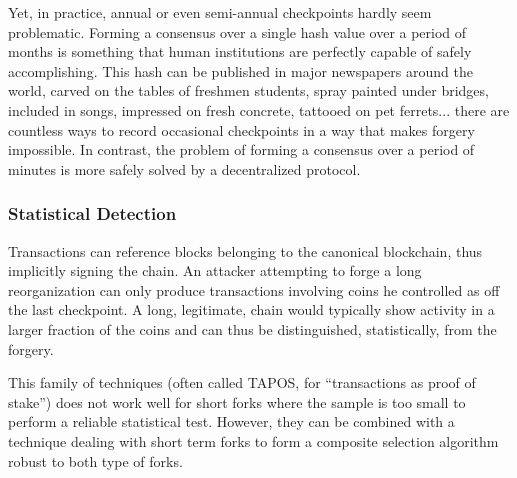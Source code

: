 \documentclass[letterpaper]{article}
\begin{document}
Yet, in practice, annual or even semi-annual checkpoints hardly seem problematic.
Forming a consensus over a single hash value over a period of months is
something that human institutions are perfectly capable of safely accomplishing.
This hash can be published in major newspapers around the world,
carved on the tables of freshmen students, spray painted under bridges,
included in songs, impressed on fresh concrete, tattooed on pet ferrets...
there are countless ways to record occasional checkpoints
in a way that makes forgery impossible.
In contrast, the problem of forming a consensus over a period of minutes
is more safely solved by a decentralized protocol.

\subsubsection{Statistical Detection}
Transactions can reference blocks belonging to the canonical blockchain,
thus implicitly signing the chain. An attacker attempting to forge a 
long reorganization can only produce transactions involving coins he
controlled as off the last checkpoint. A long, legitimate, chain would
typically show activity in a larger fraction of the coins and can thus
be distinguished, statistically, from the forgery.

This family of techniques (often called TAPOS, for
``transactions as proof of stake'') does not work well for short forks where the sample
is too small to perform a reliable statistical test. However, they can be combined
with a technique dealing with short term forks to form a composite selection
algorithm robust to both type of forks.

\end{document}
